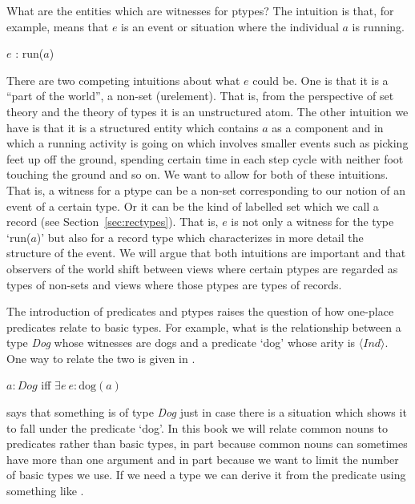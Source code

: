 What are the entities which are witnesses for ptypes?  The intuition is
that, for example, \nexteg{} means that $e$ is an event or situation where the individual $a$ is
running.
\begin{ex}
$e$ : run($a$)
\end{ex}
There are two competing intuitions about what $e$ could be.
One is that it is a ``part of the world'', a non-set (urelement).  That is, from
the perspective of set theory and the theory of types it is an unstructured
atom.  The other intuition we have is that it is a structured entity which
contains $a$ as a component and in which a running activity is going
on which involves smaller events such as picking feet up off the
ground, spending certain time in each step cycle with neither foot
touching the ground and so on.  We want to allow for both of these
intuitions.  That is, a witness for a ptype can be a non-set
corresponding to our notion of an event of a certain type.  Or it can
be the kind of labelled set which we call a record (see
Section~\ref{sec:rectypes}).  That is, $e$ is not only a witness for
the type `run($a$)' but also for a record type which
characterizes in more detail the structure of the event.  We will
argue that both intuitions are important and that
observers of the world shift between views where certain
ptypes are regarded as types of non-sets and views where those
ptypes are types of records.

The introduction of predicates  and ptypes raises
the question of how one-place predicates relate to basic types.  For
example, what is the relationship between a type \textit{Dog} whose
witnesses are dogs and a predicate `dog' whose arity is
$\langle\textit{Ind}\rangle$.  One way to relate the two is given in
\nexteg{}.
\begin{ex} 
$a:\textit{Dog}$ iff $\exists e\ e:\text{dog}(a)$ 
\end{ex} 
\preveg{} says that something is of type \textit{Dog} just in case
there is a situation which shows it to fall under the predicate
`dog'. In this book we will relate common nouns to predicates rather
than basic types, in part because common nouns can sometimes have
more than one argument and in part because we want to limit the number
of basic types we use.  If we need a type we can derive it from the
predicate using something like \preveg{}.

